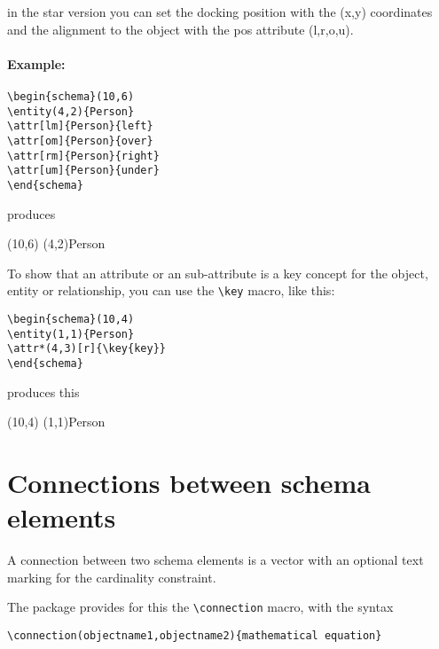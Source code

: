 \documentclass[a4paper,11pt]{article}
\begin{document}
in the star version you can set the docking position with the (x,y) coordinates
and the alignment to the object with the pos attribute (l,r,o,u).

\paragraph{Example:}

\begin{verbatim}
\begin{schema}(10,6)
\entity(4,2){Person}
\attr[lm]{Person}{left}
\attr[om]{Person}{over}
\attr[rm]{Person}{right}
\attr[um]{Person}{under}
\end{schema}
\end{verbatim}

produces

\begin{schema}(10,6)
\entity(4,2){Person}
\end{schema}

To show that an attribute or an sub-attribute is a key concept for the object, entity or relationship,
you can use the \verb|\key| macro, like this:

\begin{verbatim}
\begin{schema}(10,4)
\entity(1,1){Person}
\attr*(4,3)[r]{\key{key}}
\end{schema}
\end{verbatim}

produces this

\begin{schema}(10,4)
\entity(1,1){Person}
\end{schema}

\section{Connections between schema elements}

A connection between two schema elements is a vector with an optional
text marking for the cardinality constraint.

The package provides for this the \verb|\connection| macro, with the syntax

\begin{verbatim}
\connection(objectname1,objectname2){mathematical equation}
\end{verbatim}
\end{document}
